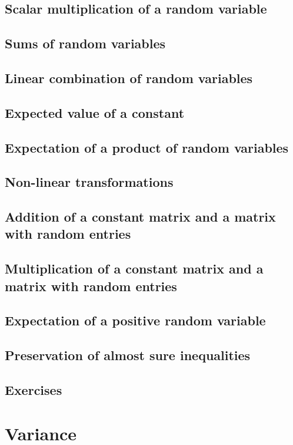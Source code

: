 \documentclass{report}
\begin{document}
	\subsection{Scalar multiplication of a random variable} %
	\subsection{Sums of random variables} %
	\subsection{Linear combination of random variables} %
	\subsection{Expected value of a constant} %
	\subsection{Expectation of a product of random variables} %
	\subsection{Non-linear transformations} %
	\subsection{Addition of a constant matrix and a matrix with random entries} %
	\subsection{Multiplication of a constant matrix and a matrix with random entries} %
	\subsection{Expectation of a positive random variable} %
	\subsection{Preservation of almost sure inequalities} %
	\subsection{Exercises} %
	
	\section{Variance}
\end{document}
